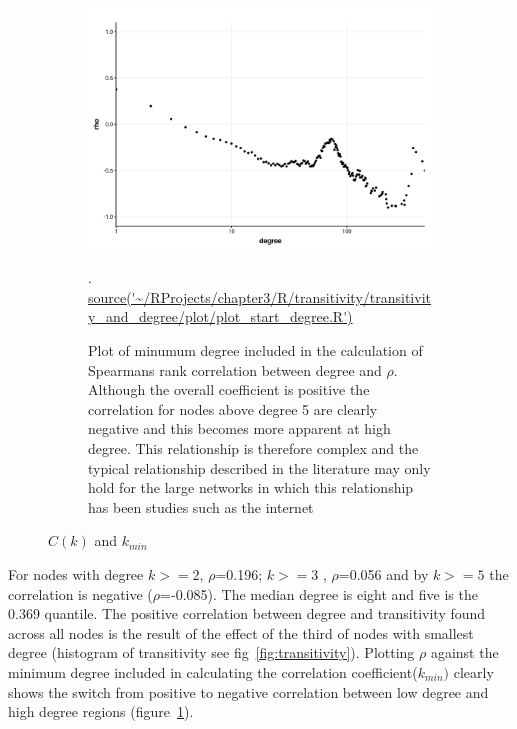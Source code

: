 \begin{figure}
\begin{subfigure}[t]{0.45\textwidth}
        \centering
        \includegraphics[width=\textwidth]{images/chapter3/ggplot2/degree_and_transitivity/Rplot_rho_and_starting_degree_transitivity.png}
        \caption{Plot of minumum degree included in the calculation of Spearmans rank correlation between degree and $\rho$. Although the overall coefficient is positive the correlation for nodes above degree 5 are clearly negative and this becomes more apparent at high degree. This relationship is therefore complex and the typical relationship described in the literature may only hold for the large networks in which this relationship has been studies such as the internet}.
    \tiny\url{source('~/RProjects/chapter3/R/transitivity/transitivity_and_degree/plot/plot_start_degree.R')}
    \label{fig:Plot of minumum degree included in the calculation of Spearmans rank correlation between degree and rho}
    \end{subfigure}
    \caption{$C(k)$ and $k_{min}$}
    \label{fig:Plots of degree distribution}
\end{figure}


For nodes with degree $k>=2$, $\rho$=0.196; $k>=3$ , $\rho$=0.056 and by $k>=5$ the correlation is negative ($\rho$=-0.085). The median degree is eight and five is the 0.369 quantile. The positive correlation between degree and transitivity found across all nodes is the result of the effect of the third of nodes with smallest degree (histogram of transitivity  see fig~\ref{fig:transitivity}). Plotting $\rho$ against the minimum degree included in calculating the correlation coefficient($k_{min})$ clearly shows the switch from positive to negative correlation between low degree and high degree regions (figure~\ref{fig:Plot of minumum degree included in the calculation of Spearmans rank correlation between degree and rho}).


